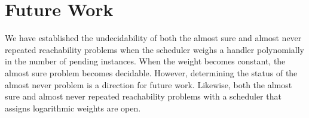 \documentclass{article}
\theoremstyle{remark}
\begin{document}
\section{Future Work}
We have established the undecidability of both the almost sure and almost never repeated reachability problems when the scheduler weighs a handler polynomially in the number of pending instances. When the weight becomes constant, the almost sure problem becomes decidable. However, determining the status of the almost never problem is a direction for future work. Likewise, both the almost sure and almost never repeated reachability problems with a scheduler that assigns logarithmic weights are open.




\end{document}
